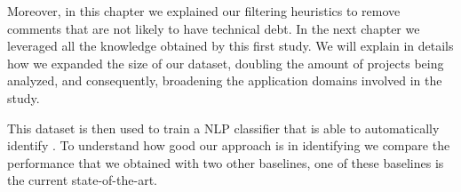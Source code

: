 Moreover, in this chapter we explained our filtering heuristics to remove comments that are not likely to have technical debt. In the next chapter we leveraged all the knowledge obtained by this first study. We will explain in details how we expanded the size of our dataset, doubling the amount of projects being analyzed, and consequently, broadening the application domains involved in the study.

This dataset is then used to train a NLP classifier that is able to automatically identify \SATD. To understand how good our approach is in identifying \SATD we compare the performance that we obtained with two other baselines, one of these baselines is the current state-of-the-art. 
